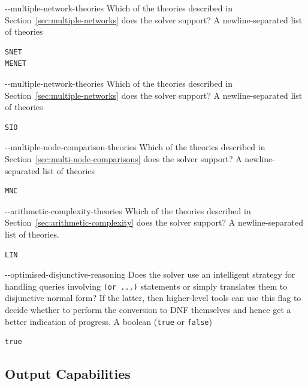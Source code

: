 \clOutputOption
{{-}-multiple-network-theories}
{Which of the \multiNetwork{} theories described in Section~\ref{sec:multiple-networks} does the solver support?}
{A newline-separated list of theories}
\begin{lstlisting}[style=bash]
%*\exampleSolver* supports --multiple-network-theories
SNET
MENET
\end{lstlisting}

\clOutputOption
{-{}-multiple-network-theories}
{Which of the \multiNetwork{} theories described in Section~\ref{sec:multiple-networks} does the solver support?}
{A newline-separated list of theories}
\begin{lstlisting}[style=bash]
%*\exampleSolver* supports --multiple-network-theories
SIO
\end{lstlisting}

\clOutputOption
{-{}-multiple-node-comparison-theories}
{Which of the \multiComparison{} theories described in Section~\ref{sec:multi-node-comparisons} does the solver support?}
{A newline-separated list of theories}
\begin{lstlisting}[style=bash]
%*\exampleSolver* supports --multiple-node-comparison-theories
MNC
\end{lstlisting}

\clOutputOption
{-{}-arithmetic-complexity-theories}
{Which of the \arithComplexity{} theories described in Section~\ref{sec:arithmetic-complexity} does the solver support?
}
{A newline-separated list of theories.}
\begin{lstlisting}[style=bash]
%*\exampleSolver* supports --arithmetic-complexity-theories
LIN
\end{lstlisting}


\clOutputOption
{-{}-optimised-disjunctive-reasoning}
{Does the solver use an intelligent strategy for handling queries involving \texttt{(or ...)} statements or simply translates them to disjunctive normal form? If the latter, then higher-level tools can use this flag to decide whether to perform the conversion to DNF themselves and hence get a better indication of progress.
}
{A boolean (\texttt{true} or \texttt{false})}
\begin{lstlisting}[style=bash]
%*\exampleSolver* supports --optimised-disjunctive-reasoning
true
\end{lstlisting}

\subsection{Output Capabilities}
\label{sec:other-capabilities}

